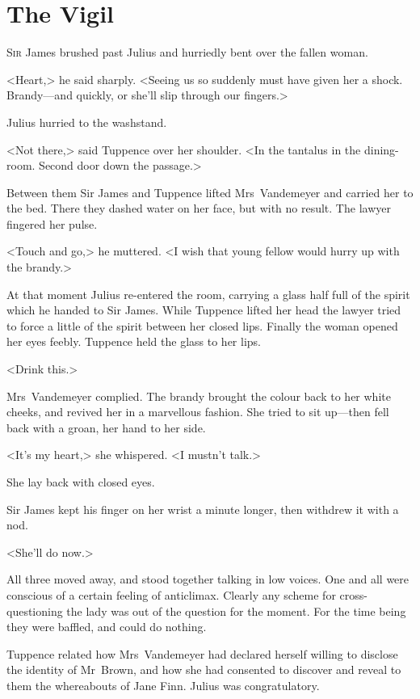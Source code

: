 \chapter{The Vigil} 

 \lettrine{S}{ir} James brushed past Julius and hurriedly bent over the fallen woman.

\zz
<Heart,> he said sharply. <Seeing us so suddenly must have given her a shock. Brandy—and quickly, or she'll slip through our fingers.>

Julius hurried to the washstand.

<Not there,> said Tuppence over her shoulder. <In the tantalus in the dining-room. Second door down the passage.>

Between them Sir James and Tuppence lifted Mrs~Vandemeyer and carried her to the bed. There they dashed water on her face, but with no result. The lawyer fingered her pulse.

<Touch and go,> he muttered. <I wish that young fellow would hurry up with the brandy.>

At that moment Julius re-entered the room, carrying a glass half full of the spirit which he handed to Sir James. While Tuppence lifted her head the lawyer tried to force a little of the spirit between her closed lips. Finally the woman opened her eyes feebly. Tuppence held the glass to her lips.

<Drink this.>

Mrs~Vandemeyer complied. The brandy brought the colour back to her white cheeks, and revived her in a marvellous fashion. She tried to sit up—then fell back with a groan, her hand to her side.

<It's my heart,> she whispered. <I mustn't talk.>

She lay back with closed eyes.

Sir James kept his finger on her wrist a minute longer, then withdrew it with a nod.

<She'll do now.>

All three moved away, and stood together talking in low voices. One and all were conscious of a certain feeling of anticlimax. Clearly any scheme for cross-questioning the lady was out of the question for the moment. For the time being they were baffled, and could do nothing.

Tuppence related how Mrs~Vandemeyer had declared herself willing to disclose the identity of Mr~Brown, and how she had consented to discover and reveal to them the whereabouts of Jane Finn. Julius was congratulatory.

